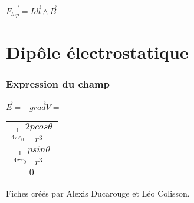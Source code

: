 \documentclass[9pt]{article}
\begin{document}
\begin{multicols*}{2}
$\overrightarrow{F_{lap}}=I\overrightarrow{dl}\wedge\overrightarrow{B}$


\part*{Dipôle électrostatique}


\section{Expression du champ}

$\overrightarrow{E}=-\overrightarrow{grad}V= $
\begin{tabular}{|c}
$\frac{1}{4\pi \varepsilon _0}\dfrac{2p cos\theta}{r^3}$ \\ 

$\frac{1}{4\pi \varepsilon _0}\dfrac{p sin\theta}{r^3}$ \\ 

$0$ \\ 
\end{tabular} 
\vfill\null
\footnotesize{Fiches créés par Alexis Ducarouge et Léo Colisson.}
\end{multicols*}
\end{document}
